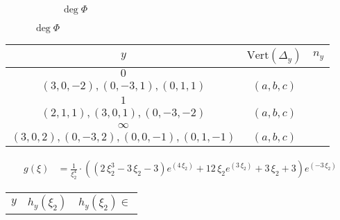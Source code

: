 {\begin{figure}[H]
{\begin{subfigure}[b]{0.40\textwidth}
	\caption*{$\deg \Phi $}
\end{subfigure}
}
\end{figure}
\begin{tabularx}{\textwidth}{|c|c|c}
\toprule
\(y\) & \(\text{Vert}(\Delta_y)\) & \(n_y\) \\
\midrule
\(0\) & \begin{tabular}{l} \((-3,0,1),(-2,1,1),(2,1,-1),\) \\ \hspace{1cm} \((3,0,-2),(0,-3,1),(0,1,1)\) \end{tabular} & \((a,b,c)\) \\ \midrule
\(1\) & \begin{tabular}{l} \((-3,0,1),(-2,1,1),(0,1,0),\) \\ \hspace{1cm} \((2,1,1),(3,0,1),(0,-3,-2)\) \end{tabular} & \((a,b,c)\) \\ \midrule
\(\infty\) & \begin{tabular}{l} \((-3,0,-1),(-2,1,-1),(2,1,1),\) \\ \hspace{1cm} \((3,0,2),(0,-3,2),(0,0,-1),(0,1,-1)\) \end{tabular} & \((a,b,c)\) \\
\midrule
\end{tabularx}
\begin{align*}
g(\xi) &= \frac{1}{\xi_{2}^{4}}\cdot\left({\left(2 \, \xi_{2}^{3} - 3 \, \xi_{2} - 3\right)} e^{\left(4 \, \xi_{2}\right)} + 12 \, \xi_{2} e^{\left(3 \, \xi_{2}\right)} + 3 \, \xi_{2} + 3\right) e^{\left(-3 \, \xi_{2}\right)}
\end{align*}
\begin{tabularx}{\textwidth}{|c|c|c}
\toprule
\(y\) & \( h_y(\xi_2)\) & \( h_y(\xi_2) \in\) \\

\end{tabularx}}
